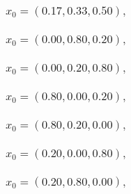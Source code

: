 \documentclass[a4paper]{article}
\begin{document}
\begin{multicols*}{2}
   \subsubsection{\(x_0 = (0.17,0.33,0.50),\quad \)}
   

   \subsubsection{\(x_0 = (0.00,0.80,0.20),\quad \)}
   

   \subsubsection{\(x_0 = (0.00,0.20,0.80),\quad \)}
   

   \subsubsection{\(x_0 = (0.80,0.00,0.20),\quad \)}
   

   \subsubsection{\(x_0 = (0.80,0.20,0.00),\quad \)}
   

   \subsubsection{\(x_0 = (0.20,0.00,0.80),\quad \)}
   

   \subsubsection{\(x_0 = (0.20,0.80,0.00),\quad \)}
   
%
   \end{multicols*}
   
\end{document}
